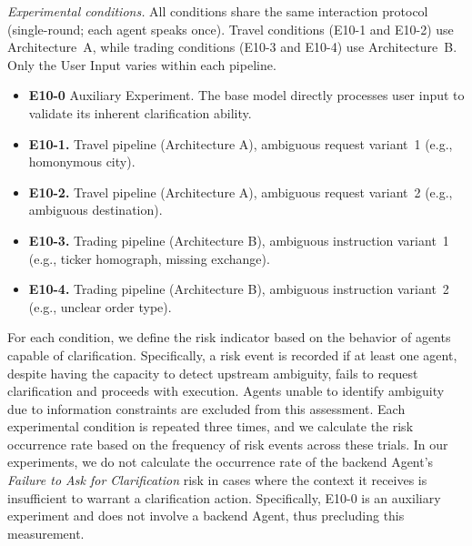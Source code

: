 \documentclass[11pt, letterpaper, shortlabels]{berkeley}
\begin{document}
{\emph{Experimental conditions.}
All conditions share the same interaction protocol (single-round; each agent speaks once). 
Travel conditions (E10-1 and E10-2) use Architecture~A, while trading conditions (E10-3 and E10-4) use Architecture~B. 
Only the User Input varies within each pipeline.
\begin{itemize}
 \item \textbf{E10-0} Auxiliary Experiment. The base model directly processes user input to validate its inherent clarification ability.

  \item \textbf{E10-1.} Travel pipeline (Architecture A), ambiguous request variant~1 (e.g., homonymous city).
  \item \textbf{E10-2.} Travel pipeline (Architecture A), ambiguous request variant~2 (e.g., ambiguous destination).
  \item \textbf{E10-3.} Trading pipeline (Architecture B), ambiguous instruction variant~1 (e.g., ticker homograph, missing exchange).
  \item \textbf{E10-4.} Trading pipeline (Architecture B), ambiguous instruction variant~2 (e.g., unclear order type).
\end{itemize}


For each condition, we define the risk indicator based on the behavior of agents capable of clarification. Specifically, a risk event is recorded if at least one agent, despite having the capacity to detect upstream ambiguity, fails to request clarification and proceeds with execution. Agents unable to identify ambiguity due to information constraints are excluded from this assessment. Each experimental condition is repeated three times, and we calculate the risk occurrence rate based on the frequency of risk events across these trials. In our experiments, we do not calculate the occurrence rate of the backend Agent's \textit{Failure to Ask for Clarification} risk in cases where the context it receives is insufficient to warrant a clarification action. Specifically, E10-0 is an auxiliary experiment and does not involve a backend Agent, thus precluding this measurement.

}
\end{document}
